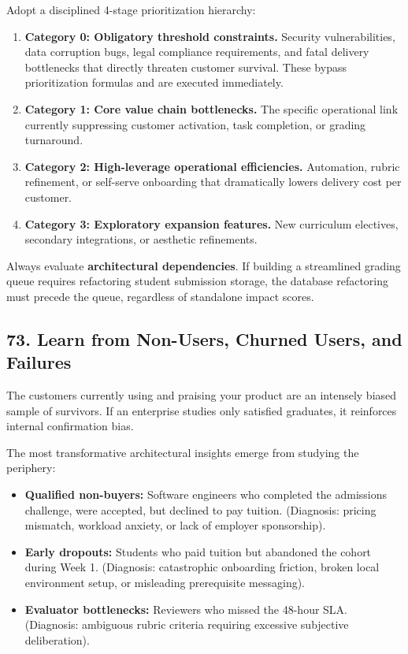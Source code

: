 Adopt a disciplined 4-stage prioritization hierarchy:
\begin{enumerate}
    \item \textbf{Category 0: Obligatory threshold constraints.} Security vulnerabilities, data corruption bugs, legal compliance requirements, and fatal delivery bottlenecks that directly threaten customer survival. These bypass prioritization formulas and are executed immediately.
    \item \textbf{Category 1: Core value chain bottlenecks.} The specific operational link currently suppressing customer activation, task completion, or grading turnaround.
    \item \textbf{Category 2: High-leverage operational efficiencies.} Automation, rubric refinement, or self-serve onboarding that dramatically lowers delivery cost per customer.
    \item \textbf{Category 3: Exploratory expansion features.} New curriculum electives, secondary integrations, or aesthetic refinements.
\end{enumerate}

Always evaluate \textbf{architectural dependencies}. If building a streamlined grading queue requires refactoring student submission storage, the database refactoring must precede the queue, regardless of standalone impact scores.

\subsection*{73. Learn from Non-Users, Churned Users, and Failures}

The customers currently using and praising your product are an intensely biased sample of survivors. If an enterprise studies only satisfied graduates, it reinforces internal confirmation bias.

The most transformative architectural insights emerge from studying the periphery:
\begin{itemize}
    \item \textbf{Qualified non-buyers:} Software engineers who completed the admissions challenge, were accepted, but declined to pay tuition. (Diagnosis: pricing mismatch, workload anxiety, or lack of employer sponsorship).
    \item \textbf{Early dropouts:} Students who paid tuition but abandoned the cohort during Week 1. (Diagnosis: catastrophic onboarding friction, broken local environment setup, or misleading prerequisite messaging).
    \item \textbf{Evaluator bottlenecks:} Reviewers who missed the 48-hour SLA. (Diagnosis: ambiguous rubric criteria requiring excessive subjective deliberation).
\end{itemize}

